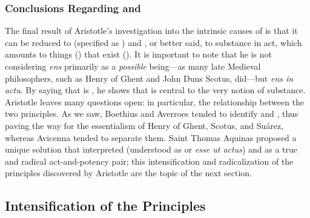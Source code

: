 \subsubsection{Conclusions Regarding  and }

The final result of Aristotle's investigation into the intrinsic causes of  is that it can be reduced to  (specified as ) and , or better said, to substance in act, which amounts to things () that exist (). It is important to note that he is not considering \emph{ens} primarily as a \emph{possible} being---as many late Medieval philosophers, such as Henry of Ghent and John Duns Scotus, did---but \emph{ens in actu}. By saying that  is , he shows that  is central to the very notion of substance. Aristotle leaves many questions open: in particular, the relationship between the two principles. As we saw, Boethius and Averroes tended to identify  and , thus paving the way for the essentialism of Henry of Ghent, Scotus, and Suárez, whereas Avicenna tended to separate them. Saint Thomas Aquinas proposed a unique solution that interpreted  (understood as  or \emph{esse ut actus}) and  as a true and radical act-and-potency pair; this intensification and radicalization of the principles discovered by Aristotle are the topic of the next section.

\subsection{Intensification of the Principles}

